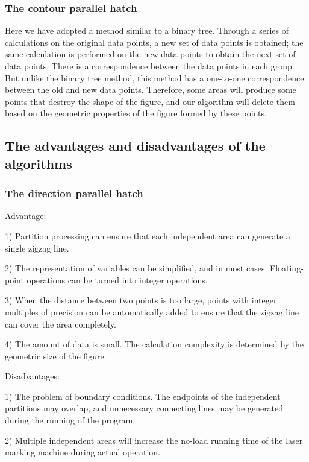 \documentclass{apmcmthesis}
\begin{document}
\subsubsection{The contour parallel hatch}

Here we have adopted a method similar to a binary tree. Through a series of calculations on the original data points, a new set of data points is obtained; the same calculation is performed on the new data points to obtain the next set of data points. There is a correspondence between the data points in each group. But unlike the binary tree method, this method has a one-to-one correspondence between the old and new data points. Therefore, some areas will produce some points that destroy the shape of the figure, and our algorithm will delete them based on the geometric properties of the figure formed by these points.

\subsection{The advantages and disadvantages of the algorithms}

\subsubsection{The direction parallel hatch}

Advantage:


1) Partition processing can ensure that each independent area can generate a single zigzag line.


2) The representation of variables can be simplified, and in most cases. Floating-point operations can be turned into integer operations.


3) When the distance between two points is too large, points with integer multiples of precision can be automatically added to ensure that the zigzag line can cover the area completely.


4) The amount of data is small. The calculation complexity is determined by the geometric size of the figure.


Disadvantages:


1) The problem of boundary conditions. The endpoints of the independent partitions may overlap, and unnecessary connecting lines may be generated during the running of the program.


2) Multiple independent areas will increase the no-load running time of the laser marking machine during actual operation.
\end{document}
